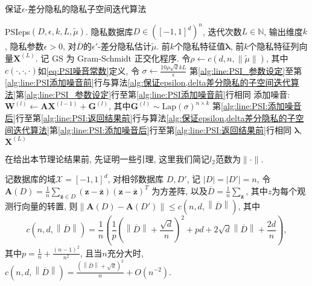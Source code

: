 \begin{algorithm}[hbtp]
	\caption{保证$\epsilon$-差分隐私的隐私子空间迭代算法\parencite{hardt2013robust}}\label{alg:保证epsilon差分隐私的子空间迭代算法}
	\begin{algorithmic}[1]
    \INTERFACE PSIeps$(D, \epsilon, k, L,  \tilde{\mu})$. 
		\REQUIRE 隐私数据库$D \in([-1,1]^d)^n$, 迭代次数$L\in \mathbb{N}$, 输出维度$k$, 隐私参数$\epsilon > 0$, 对$\overline{D}$的$\epsilon'$-差分隐私估计$\tilde{\mu}$.
		\ENSURE 前$k$个隐私特征值$\boldsymbol\lambda$, 前$k$个隐私特征列向量$\mathbf{X}^{(L)}$.
		\NOTATION 记 $\mathrm{GS}$ 为 Gram-Schmidt 正交化程序.
		\STATE 令$\rho \leftarrow c(d, n, \|\tilde{\mu}\|)$, 其中$c(\cdot, \cdot, \cdot)$如\eqref{eq:PSI噪音常数}定义, 令 $\sigma\leftarrow \frac{10\rho \sqrt{d}kL}{\epsilon}$
    \STATE 第\ref{alg:line:PSI_参数设定}至第\ref{alg:line:PSI添加噪音前}行与算法\ref{alg:保证epsilon,delta差分隐私的子空间迭代算法}第\ref{alg:line:PSI_参数设定}行至第\ref{alg:line:PSI添加噪音前}行相同
    \STATE 添加噪音: $\mathbf{W}^{(l)} \leftarrow \mathbf{A}\mathbf{X}^{(l-1)}+\mathbf{G}^{(l)}$, 其中$\mathbf{G}^{(l)}\sim \mathrm{Lap}( \sigma)^{n\times k}$ \label{alg:line:PSI:eps:添加噪音}
    \STATE  第\ref{alg:line:PSI:添加噪音后}行至第\ref{alg:line:PSI:返回结果前}行与算法\ref{alg:保证epsilon,delta差分隐私的子空间迭代算法}第\ref{alg:line:PSI:添加噪音后}行至第\ref{alg:line:PSI:返回结果前}行相同
    \RETURN $\boldsymbol\lambda$, $\mathbf{X}^{(L)}$
	\end{algorithmic}
\end{algorithm}
在给出本节理论结果前, 先证明一些引理, 这里我们简记$l_2$范数为$\|\cdot\|$.
\begin{lem}\label{lem:方差阵敏感性}
	记数据库的域$\mathcal{X} = [-1,1]^d$, 对相邻数据库 $D, D'$, 记 $|D| = |D'| = n$, 令 $\mathbf{A}(D)=\frac{1}{n}\sum_{\mathbf{z}\in D} (\mathbf{z}-\overline{\mathbf{z}})(\mathbf{z}-\overline{\mathbf{z}})^T$ 为方差阵, 以及$\overline{D} = \frac{1}{n}\sum_{\mathbf{z}}$, 其中$z$为每个观测行向量的转置, 则$\|\mathbf{A}(D) - \mathbf{A}(D')\| \le c\left(n, d, \left\|\overline{D}\right\|\right)$, 其中
	\begin{equation}\label{eq:PSI噪音常数}
	  c\left(n, d, \left\|\overline{D}\right\|\right) =  \frac{1}{n} \left( \frac{1}{p} \left(\left\|\overline{D}\right\| + \frac{\sqrt{d}}{n}\right)^2 + pd + 2\sqrt{d}\left\|\overline{D}\right\| + \frac{2d}{n} \right),
	\end{equation}
  其中$p = \frac{1}{n} + \frac{(n-1)^2}{n^2}$, 且当$n$充分大时, $c\left(n, d, \left\|\overline{D}\right\|\right) =  \frac{\left(\left\|\overline{D}\right\| + \sqrt{d}\right)^2}{n} + O(n^{-2})$.
\end{lem}
